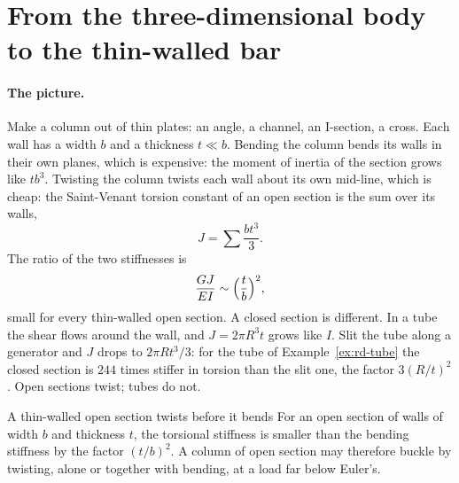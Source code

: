 \section{From the three-dimensional body to the thin-walled bar}\label{sec:tw-3d}
%

\paragraph{The picture.}
Make a column out of thin plates: an angle, a channel, an I-section, a cross. Each wall has a
width $b$ and a thickness $t \ll b$. Bending the column bends its walls in their own planes, which
is expensive: the moment of inertia of the section grows like $tb^3$. Twisting the column twists
each wall about its own mid-line, which is cheap: the Saint-Venant torsion constant of an open
section is the sum over its walls,
\begin{equation}\label{eq:tw-J}
  J = \sum \frac{bt^3}{3} .
\end{equation}
The ratio of the two stiffnesses is
\begin{equation}\label{eq:tw-ratio}
  \frac{GJ}{EI} \sim \Bigl(\frac tb\Bigr)^2 ,
\end{equation}
small for every thin-walled open section. A closed section is different. In a tube the shear flows
around the wall, and $J = 2\pi R^3t$ grows like $I$. Slit the tube along a generator and $J$ drops
to $2\pi Rt^3/3$: for the tube of Example~\ref{ex:rd-tube} the closed section is $244$ times stiffer in
torsion than the slit one, the factor $3(R/t)^2$. Open sections twist; tubes do not.

\begin{gbox}{A thin-walled open section twists before it bends}\label{sec:tw-twistfirst}
%
For an open section of walls of width $b$ and thickness $t$, the torsional stiffness is smaller
than the bending stiffness by the factor $(t/b)^2$. A column of open section may therefore buckle by
twisting, alone or together with bending, at a load far below Euler's.
\end{gbox}

